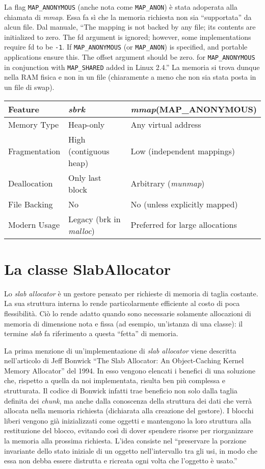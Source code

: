 La flag \texttt{MAP\_ANONYMOUS} (anche nota come \texttt{MAP\_ANON}) è stata adoperata alla chiamata di \textit{mmap}. Essa fa sì che la memoria richiesta non sia “supportata” da alcun file. Dal manuale, “The mapping is not backed by any file; its contents are initialized to zero. The fd argument is ignored; however, some implementations require fd to be \texttt{-1}. If \texttt{MAP\_ANONYMOUS} (or \texttt{MAP\_ANON}) is specified, and portable applications ensure this. The offset argument should be zero. for \texttt{MAP\_ANONYMOUS} in conjunction with \texttt{MAP\_SHARED} added in Linux 2.4.” La memoria si trova dunque nella RAM fisica e non in un file (chiaramente a meno che non sia stata posta in un file di swap).

\begin{center}
\begin{tabular}{|l|l|l|}
\hline
Feature & \textit{sbrk} & \textit{mmap}(MAP\_ANONYMOUS) \\
\hline
Memory Type & Heap-only & Any virtual address \\
Fragmentation & High (contiguous heap) & Low (independent mappings) \\
Deallocation & Only last block & Arbitrary (\textit{munmap}) \\
File Backing & No & No (unless explicitly mapped) \\
Modern Usage & Legacy (brk in \textit{malloc}) & Preferred for large allocations \\
\hline
\end{tabular}
\end{center}

\section{La classe SlabAllocator}
Lo \textit{slab allocator} è un gestore pensato per richieste di memoria di taglia costante. La sua struttura interna lo rende particolarmente efficiente al costo di poca flessibilità. Ciò lo rende adatto quando sono necessarie solamente allocazioni di memoria di dimensione nota e fissa (ad esempio, un'istanza di una classe): il termine \textit{slab} fa riferimento a questa “fetta” di memoria.

La prima menzione di un’implementazione di \textit{slab allocator} viene descritta nell’articolo di Jeff Bonwick “The Slab Allocator: An Object-Caching Kernel Memory Allocator” del 1994. In esso vengono elencati i benefici di una soluzione che, rispetto a quella da noi implementata, risulta ben più complessa e strutturata. Il codice di Bonwick infatti trae beneficio non solo dalla taglia definita dei \textit{chunk}, ma anche dalla conoscenza della struttura dei dati che verrà allocata nella memoria richiesta (dichiarata alla creazione del gestore). I blocchi liberi vengono già inizializzati come oggetti e mantengono la loro struttura alla restituzione del blocco, evitando così di dover spendere risorse per riorganizzare la memoria alla prossima richiesta. L’idea consiste nel “preservare la porzione invariante dello stato iniziale di un oggetto nell’intervallo tra gli usi, in modo che essa non debba essere distrutta e ricreata ogni volta che l’oggetto è usato.”

